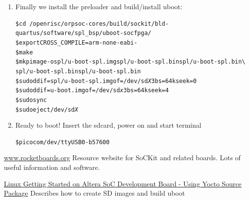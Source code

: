 \documentclass[twoside]{article}
\begin{document}
\begin{enumerate}
\item Finally we install the preloader and build/install uboot:
  \begin{alltt}
\$ cd ~/openrisc/orpsoc-cores/build/sockit/bld-quartus/software/spl_bsp/uboot-socfpga/
\$ export CROSS_COMPILE=arm-none-eabi-
\$ make
\$ mkpimage -o spl/u-boot-spl.img spl/u-boot-spl.bin spl/u-boot-spl.bin \textbackslash
               spl/u-boot-spl.bin spl/u-boot-spl.bin
\$ sudo dd if=spl/u-boot-spl.img of=/dev/sd\emph{X}3 bs=64k seek=0
\$ sudo dd if=u-boot.img of=/dev/sd\emph{x}3 bs=64k seek=4
\$ sudo sync
\$ sudo eject /dev/sd\emph{X}    
  \end{alltt}

\item Ready to boot! Insert the sdcard, power on and start terminal
    \begin{alltt}
\$ picocom /dev/ttyUSB0 -b 57600
    \end{alltt}

\end{enumerate}




\begin{thebibliography}{99} 

 \url{www.rocketboards.org}
  Resource website for SoCKit and related boards. Lots of useful
  information and software.

    \href{http://www.rocketboards.org/foswiki/Documentation/AlteraSoCDevelopmentBoardYoctoGettingStarted}{Linux
      Getting Started on Altera SoC Development Board - Using Yocto
      Source Package}
    Describes how to create SD images and build uboot

\end{thebibliography}


\end{document}
